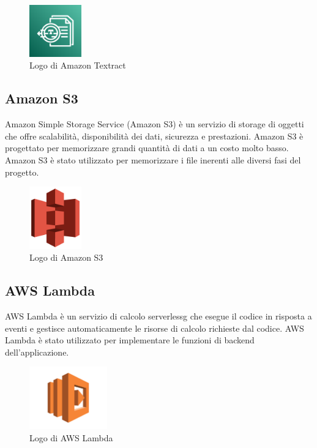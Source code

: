 \begin{figure}[h]
  \centering
  \includegraphics[width=0.2\textwidth]{img/tecnologie/textract.png}
  \caption{Logo di Amazon Textract}
  \label{fig:textract}
\end{figure}

\subsection{Amazon S3}
Amazon Simple Storage Service (Amazon S3) è un servizio di storage di oggetti che offre scalabilità, disponibilità dei dati, sicurezza e prestazioni. Amazon S3 è progettato per memorizzare grandi quantità di dati a un costo molto basso. Amazon S3 è stato utilizzato per memorizzare i file inerenti alle diversi fasi del progetto.

\begin{figure}[h]
  \centering
  \includegraphics[width=0.2\textwidth]{img/tecnologie/s3.png}
  \caption{Logo di Amazon S3}
  \label{fig:s3}
\end{figure}

\subsection{AWS Lambda}
AWS Lambda è un servizio di calcolo \gls{serverlessg} che esegue il codice in risposta a eventi e gestisce automaticamente le risorse di calcolo richieste dal codice. AWS Lambda è stato utilizzato per implementare le funzioni di backend dell'applicazione. 

\begin{figure}[h]
  \centering
  \includegraphics[width=0.3\textwidth]{img/tecnologie/AWS_Lambda.png}
  \caption{Logo di AWS Lambda}
  \label{fig:lambda}
\end{figure}

